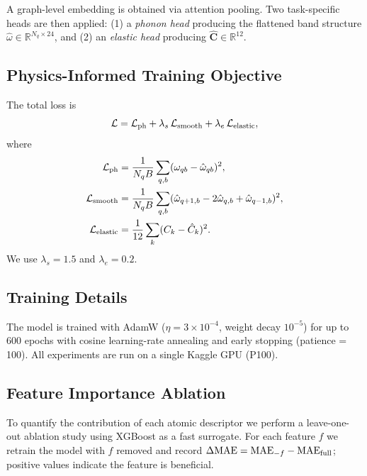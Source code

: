 A graph-level embedding is obtained via attention pooling.
Two task-specific heads are then applied:
(1) a \emph{phonon head} producing the flattened band structure
    $\hat{\omega}\in\mathbb{R}^{N_q\times 24}$, and
(2) an \emph{elastic head} producing
    $\hat{\mathbf{C}}\in\mathbb{R}^{12}$.

\subsection{Physics-Informed Training Objective}
\label{sec:loss}

The total loss is
\begin{equation}
  \mathcal{L} = \mathcal{L}_{\rm ph}
              + \lambda_s\,\mathcal{L}_{\rm smooth}
              + \lambda_e\,\mathcal{L}_{\rm elastic},
  \label{eq:loss}
\end{equation}
where
\begin{align}
  \mathcal{L}_{\rm ph}     &= \frac{1}{N_q B}\sum_{q,b}
       (\omega_{qb}-\hat\omega_{qb})^2, \\
  \mathcal{L}_{\rm smooth} &= \frac{1}{N_q B}\sum_{q,b}
       (\hat\omega_{q+1,b}-2\hat\omega_{q,b}+\hat\omega_{q-1,b})^2,\\
  \mathcal{L}_{\rm elastic}&= \frac{1}{12}\sum_k(C_k-\hat C_k)^2.
\end{align}
We use $\lambda_s=1.5$ and $\lambda_e=0.2$.

\subsection{Training Details}

The model is trained with AdamW ($\eta=3\times10^{-4}$,
weight decay $10^{-5}$) for up to 600 epochs with cosine
learning-rate annealing and early stopping (patience = 100).
All experiments are run on a single Kaggle GPU (P100).

\subsection{Feature Importance Ablation}
\label{sec:ablation}

To quantify the contribution of each atomic descriptor we perform
a leave-one-out ablation study using XGBoost as a fast surrogate.
For each feature $f$ we retrain the model with $f$ removed and
record $\Delta{\rm MAE}=\text{MAE}_{-f}-\text{MAE}_{\rm full}$;
positive values indicate the feature is beneficial.

